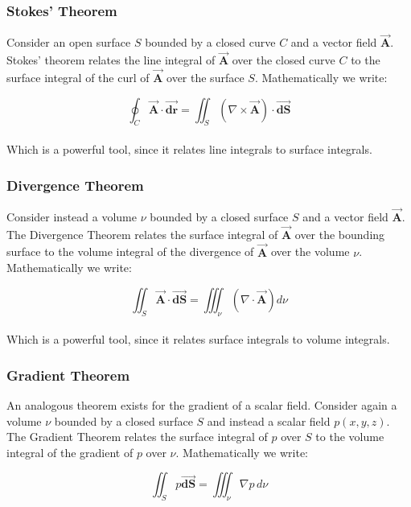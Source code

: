 \documentclass[11pt]{article}
\begin{document}
\subsubsection{Stokes' Theorem}
Consider an open surface $S$ bounded by a closed curve $C$ and a vector field $\vec{\bm{A}}$. Stokes' theorem relates the line integral of $\vec{\bm{A}}$ over the closed curve $C$ to the surface integral of the curl of $\vec{\bm{A}}$ over the surface $S$. Mathematically we write:

\begin{equation*}
    \oint_C \vec{\bm{A}} \cdot \vec{\bm{dr}} = \iint_S (\nabla \times \vec{\bm{A}}) \cdot \vec{\bm{dS}}
\end{equation*}\\
\noindent
Which is a powerful tool, since it relates line integrals to surface integrals.\\

\subsubsection{Divergence Theorem}
Consider instead a volume $\nu$ bounded by a closed surface $S$ and a vector field $\vec{\bm{A}}$. The Divergence Theorem relates the surface integral of $\vec{\bm{A}}$ over the bounding surface to the volume integral of the divergence of $\vec{\bm{A}}$ over the volume $\nu$. Mathematically we write:

\begin{equation*}
    \iint_S \vec{\bm{A}} \cdot \vec{\bm{dS}} = \iiint_\nu (\nabla \cdot \vec{\bm{A}}) d\nu
\end{equation*}\\
\noindent
Which is a powerful tool, since it relates surface integrals to volume integrals.\\

\subsubsection{Gradient Theorem}
An analogous theorem exists for the gradient of a scalar field. Consider again a volume $\nu$ bounded by a closed surface $S$ and instead a scalar field $p(x,y,z)$. The Gradient Theorem relates the surface integral of $p$ over $S$ to the volume integral of the gradient of $p$ over $\nu$. Mathematically we write:

\begin{equation*}
    \iint_S p \vec{\bm{dS}} = \iiint_\nu \nabla p\, d\nu
\end{equation*}\\
\end{document}
